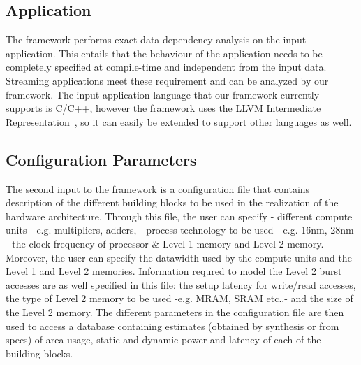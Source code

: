 \subsection{Application}
\label{ssec:app}
The framework performs exact data dependency analysis on the input application. This entails that the behaviour of the application needs to be completely specified at compile-time and independent from the input data. Streaming applications meet these requirement and can be analyzed by our framework. The input application language that our framework currently supports is C/C++, however the framework uses the LLVM Intermediate Representation~\cite{llvm}, so it can easily be extended to support other languages as well.

\subsection{Configuration Parameters}
\label{ssec:conf_param}
The second input to the framework is a configuration file that contains description of the different building blocks to be used in the realization of the hardware architecture. Through this file, the user can specify - different compute units - e.g. multipliers, adders, - process technology to be used - e.g. 16nm, 28nm - the clock frequency of processor \& Level 1 memory and Level 2 memory. Moreover, the user can specify the datawidth used by the compute units and the Level 1 and Level 2 memories. 
Information requred to model the Level 2 burst accesses are as well specified in this file: the setup latency for write/read accesses, the type of Level 2 memory to be used -e.g. MRAM, SRAM etc..- and the size of the Level 2 memory. The different parameters in the configuration file are then used to access a database containing estimates (obtained by synthesis or from specs) of area usage, static and dynamic power and latency of each of the building blocks.

%

